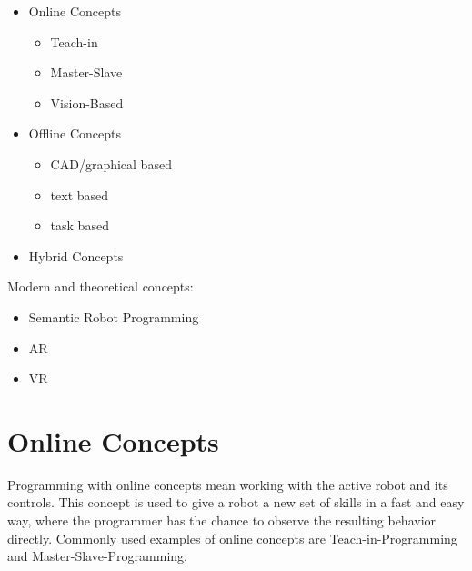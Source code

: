 \documentclass[conference]{IEEEtran}
\begin{document}
 \begin{itemize}
    \item Online Concepts
        \begin{itemize}
            \item Teach-in
            \item Master-Slave
            \item Vision-Based
        \end{itemize}
    \item Offline Concepts
        \begin{itemize}
            \item CAD/graphical based
            \item text based
            \item task based
        \end{itemize}
    \item Hybrid Concepts
 \end{itemize}

Modern and theoretical concepts:

\begin{itemize}
    \item Semantic Robot Programming
    \item AR
    \item VR
\end{itemize}

\section{Online Concepts}

Programming with online concepts mean working with the active robot and its controls. \cite[p. 186]{b4} %
This concept is used to give a robot a new set of skills in a fast and easy way, where the programmer has the chance to observe the resulting behavior directly.
Commonly used examples of online concepts are Teach-in-Programming and Master-Slave-Programming. \cite[p. 187]{b4}%

\end{document}
